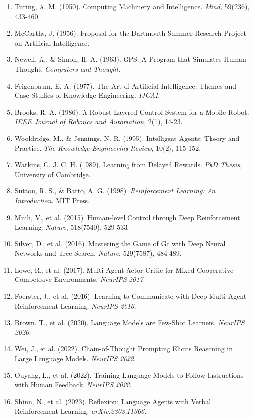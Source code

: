 \documentclass[12pt,a4paper]{article}
\begin{document}
\begin{enumerate}
    \item Turing, A. M. (1950). Computing Machinery and Intelligence. \textit{Mind}, 59(236), 433-460.
    \item McCarthy, J. (1956). Proposal for the Dartmouth Summer Research Project on Artificial Intelligence.
    \item Newell, A., \& Simon, H. A. (1963). GPS: A Program that Simulates Human Thought. \textit{Computers and Thought}.
    \item Feigenbaum, E. A. (1977). The Art of Artificial Intelligence: Themes and Case Studies of Knowledge Engineering. \textit{IJCAI}.
    \item Brooks, R. A. (1986). A Robust Layered Control System for a Mobile Robot. \textit{IEEE Journal of Robotics and Automation}, 2(1), 14-23.
    \item Wooldridge, M., \& Jennings, N. R. (1995). Intelligent Agents: Theory and Practice. \textit{The Knowledge Engineering Review}, 10(2), 115-152.
    \item Watkins, C. J. C. H. (1989). Learning from Delayed Rewards. \textit{PhD Thesis}, University of Cambridge.
    \item Sutton, R. S., \& Barto, A. G. (1998). \textit{Reinforcement Learning: An Introduction}. MIT Press.
    \item Mnih, V., et al. (2015). Human-level Control through Deep Reinforcement Learning. \textit{Nature}, 518(7540), 529-533.
    \item Silver, D., et al. (2016). Mastering the Game of Go with Deep Neural Networks and Tree Search. \textit{Nature}, 529(7587), 484-489.
    \item Lowe, R., et al. (2017). Multi-Agent Actor-Critic for Mixed Cooperative-Competitive Environments. \textit{NeurIPS 2017}.
    \item Foerster, J., et al. (2016). Learning to Communicate with Deep Multi-Agent Reinforcement Learning. \textit{NeurIPS 2016}.
    \item Brown, T., et al. (2020). Language Models are Few-Shot Learners. \textit{NeurIPS 2020}.
    \item Wei, J., et al. (2022). Chain-of-Thought Prompting Elicits Reasoning in Large Language Models. \textit{NeurIPS 2022}.
    \item Ouyang, L., et al. (2022). Training Language Models to Follow Instructions with Human Feedback. \textit{NeurIPS 2022}.
    \item Shinn, N., et al. (2023). Reflexion: Language Agents with Verbal Reinforcement Learning. \textit{arXiv:2303.11366}.

\end{enumerate}
\end{document}

